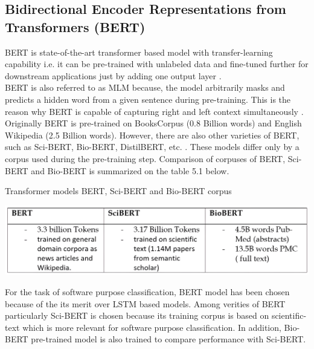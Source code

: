 \subsection{Bidirectional Encoder Representations from Transformers (\ac{BERT})}
\label{sec:chapter05:DLModels:Transformer:BERT}

BERT is state-of-the-art transformer based model with transfer-learning capability i.e. it can be pre-trained with unlabeled data and fine-tuned further for downstream applications just by adding one output layer \citep{devlin2018bert, ezen2020comparison}. \\

BERT is also referred to as \ac{MLM} because, the model arbitrarily masks and predicts a hidden word from a given sentence during pre-training. This is the reason why BERT is capable of capturing right and left context simultaneously \citep{devlin2018bert}.  \\


Originally BERT is pre-trained on BooksCorpus (0.8 Billion words) and English Wikipedia (2.5 Billion words). However, there are also other varieties of BERT, such as \ac{Sci-BERT}, \ac{Bio-BERT}, DistilBERT, etc. \citep{beltagy2019scibert, lee2020biobert, sanh2019distilbert}. These models differ only by a corpus used during the pre-training step. Comparison of corpuses of BERT, Sci-BERT and Bio-BERT is summarized on the table 5.1 below.


\begin{table}[htbp]
	\centering
	\caption{Transformer models \ac{BERT}, \ac{Sci-BERT} and \ac{Bio-BERT} corpus }
	\includegraphics[width=1\textwidth]{4.graphics/figures/ch_5/BERT_Corpus}
	\label{fig:chapter03:setup}
\end{table}

For the task of software purpose classification, BERT model has been chosen because of the its merit over LSTM based models. Among verities of BERT particularly Sci-BERT is chosen because its training corpus is based on scientific-text which is more relevant for software purpose classification. In addition, Bio-BERT pre-trained model is also trained to compare performance with Sci-BERT. \\

